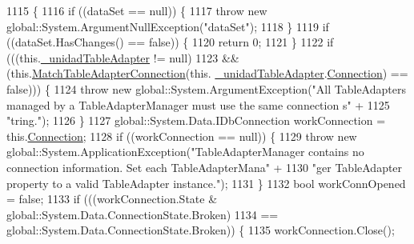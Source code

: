 \begin{DoxyCode}
1115                                                        \{
1116             \textcolor{keywordflow}{if} ((dataSet == null)) \{
1117                 \textcolor{keywordflow}{throw} \textcolor{keyword}{new} global::System.ArgumentNullException(\textcolor{stringliteral}{"dataSet"});
1118             \}
1119             \textcolor{keywordflow}{if} ((dataSet.HasChanges() == \textcolor{keyword}{false})) \{
1120                 \textcolor{keywordflow}{return} 0;
1121             \}
1122             \textcolor{keywordflow}{if} (((this.\hyperlink{class_proyecto___integrador__3_1_1ds_unidad_table_adapters_1_1_table_adapter_manager_ad273398026bf55cc8cff4c34547f7564}{\_unidadTableAdapter} != null) 
1123                         && (this.\hyperlink{class_proyecto___integrador__3_1_1ds_unidad_table_adapters_1_1_table_adapter_manager_a3c219763f9499809f966ddd0eae2f4d5}{MatchTableAdapterConnection}(this.
      \hyperlink{class_proyecto___integrador__3_1_1ds_unidad_table_adapters_1_1_table_adapter_manager_ad273398026bf55cc8cff4c34547f7564}{\_unidadTableAdapter}.\hyperlink{class_proyecto___integrador__3_1_1ds_unidad_table_adapters_1_1_unidad_table_adapter_a13a9c13fd0ce4e17d7f35891158864db}{Connection}) == \textcolor{keyword}{false}))) \{
1124                 \textcolor{keywordflow}{throw} \textcolor{keyword}{new} global::System.ArgumentException(\textcolor{stringliteral}{"All TableAdapters managed by a
       TableAdapterManager must use the same connection s"} +
1125                         \textcolor{stringliteral}{"tring."});
1126             \}
1127             global::System.Data.IDbConnection workConnection = this.\hyperlink{class_proyecto___integrador__3_1_1ds_unidad_table_adapters_1_1_table_adapter_manager_a3afb5118a58b6ca2f74483e39e7439e4}{Connection};
1128             \textcolor{keywordflow}{if} ((workConnection == null)) \{
1129                 \textcolor{keywordflow}{throw} \textcolor{keyword}{new} global::System.ApplicationException(\textcolor{stringliteral}{"TableAdapterManager contains no connection
       information. Set each TableAdapterMana"} +
1130                         \textcolor{stringliteral}{"ger TableAdapter property to a valid TableAdapter instance."});
1131             \}
1132             \textcolor{keywordtype}{bool} workConnOpened = \textcolor{keyword}{false};
1133             \textcolor{keywordflow}{if} (((workConnection.State & global::System.Data.ConnectionState.Broken) 
1134                         == global::System.Data.ConnectionState.Broken)) \{
1135                 workConnection.Close();

\end{DoxyCode}
